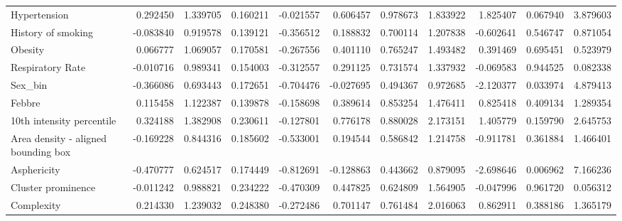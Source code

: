 \begin{table}
\begin{adjustbox}{width=0.7\paperheight, angle=90}
\begin{tabular}{|lrrrrrrrrrr|}
Hypertension                            &  0.292450 &   1.339705 &  0.160211 &       -0.021557 &        0.606457 &             0.978673 &             1.833922 &  1.825407 &  0.067940 &  3.879603 \\
History of smoking                      & -0.083840 &   0.919578 &  0.139121 &       -0.356512 &        0.188832 &             0.700114 &             1.207838 & -0.602641 &  0.546747 &  0.871054 \\
Obesity                                 &  0.066777 &   1.069057 &  0.170581 &       -0.267556 &        0.401110 &             0.765247 &             1.493482 &  0.391469 &  0.695451 &  0.523979 \\
Respiratory Rate                        & -0.010716 &   0.989341 &  0.154003 &       -0.312557 &        0.291125 &             0.731574 &             1.337932 & -0.069583 &  0.944525 &  0.082338 \\
Sex\_bin                                 & -0.366086 &   0.693443 &  0.172651 &       -0.704476 &       -0.027695 &             0.494367 &             0.972685 & -2.120377 &  0.033974 &  4.879413 \\
Febbre                                  &  0.115458 &   1.122387 &  0.139878 &       -0.158698 &        0.389614 &             0.853254 &             1.476411 &  0.825418 &  0.409134 &  1.289354 \\
10th intensity percentile               &  0.324188 &   1.382908 &  0.230611 &       -0.127801 &        0.776178 &             0.880028 &             2.173151 &  1.405779 &  0.159790 &  2.645753 \\
Area density - aligned bounding box     & -0.169228 &   0.844316 &  0.185602 &       -0.533001 &        0.194544 &             0.586842 &             1.214758 & -0.911781 &  0.361884 &  1.466401 \\
Asphericity                             & -0.470777 &   0.624517 &  0.174449 &       -0.812691 &       -0.128863 &             0.443662 &             0.879095 & -2.698646 &  0.006962 &  7.166236 \\
Cluster prominence                      & -0.011242 &   0.988821 &  0.234222 &       -0.470309 &        0.447825 &             0.624809 &             1.564905 & -0.047996 &  0.961720 &  0.056312 \\
Complexity                              &  0.214330 &   1.239032 &  0.248380 &       -0.272486 &        0.701147 &             0.761484 &             2.016063 &  0.862911 &  0.388186 &  1.365179 \\

\end{tabular}
\end{adjustbox}
\end{table}
